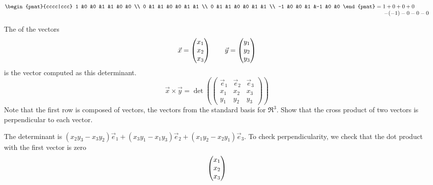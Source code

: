 \begin{exercises}
\begin{answer}
\begin{exparts}
          \begin{equation*}
            \begin{pmat}{cccc|ccc}
                       1  &0  &0  &1  &1  &0  &0  \\
                       0  &1  &1  &0  &0  &1  &1  \\
                       0  &1  &1  &0  &0  &1  &1  \\
                      -1  &0  &0  &1  &-1 &0  &0
            \end{pmat}
            =\begin{array}[t]{@{}l@{}}
               1+0+0+0 \\
               \>-(-1)-0-0-0
              \end{array}
           \end{equation*}
      \end{exparts}  
     \end{answer}
  \item 
    The 
    of the vectors
    \begin{equation*}
      \vec{x}=\begin{pmatrix} x_1 \\ x_2 \\ x_3 \end{pmatrix}
      \qquad
      \vec{y}=\begin{pmatrix} y_1 \\ y_2 \\ y_3 \end{pmatrix}
    \end{equation*}
    is the vector computed as this determinant.
    \begin{equation*}
      \vec{x}\times\vec{y}=
      \det(\begin{pmatrix}
        \vec{e}_1  &\vec{e}_2  &\vec{e}_3  \\
        x_1        &x_2        &x_3        \\
        y_1        &y_2        &y_3
      \end{pmatrix})
    \end{equation*}
    Note that the first row is composed of vectors, the vectors from the
    standard basis for $\Re^3$.
    Show that the cross product of two vectors is perpendicular to each vector.
    \begin{answer}
      The determinant is 
      $
        (x_2y_3-x_3y_2)\vec{e}_1
          +(x_3y_1-x_1y_3)\vec{e}_2
          +(x_1y_2-x_2y_1)\vec{e}_3
      $.
      To check perpendicularity, we check that the dot product
      with the first vector is zero
      \begin{equation*}
        \colvec{x_1 \\ x_2 \\ x_3}

\end{equation*}
\end{answer}
\end{exercises}
